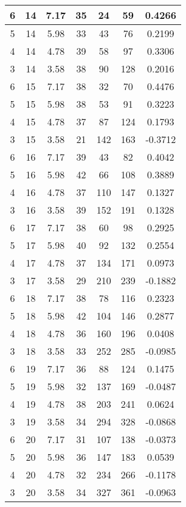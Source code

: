 \documentclass[letterpaper, 12pt]{article}
\begin{document}
\begin{longtable}{|c|c|c|c|c|c|c|}
\hline
6 & 14 & 7.17 & 35 & 24 & 59 & 0.4266 \\
\hline
5 & 14 & 5.98 & 33 & 43 & 76 & 0.2199 \\
\hline
4 & 14 & 4.78 & 39 & 58 & 97 & 0.3306 \\
\hline
3 & 14 & 3.58 & 38 & 90 & 128 & 0.2016 \\
\hline
6 & 15 & 7.17 & 38 & 32 & 70 & 0.4476 \\
\hline
5 & 15 & 5.98 & 38 & 53 & 91 & 0.3223 \\
\hline
4 & 15 & 4.78 & 37 & 87 & 124 & 0.1793 \\
\hline
3 & 15 & 3.58 & 21 & 142 & 163 & -0.3712 \\
\hline
6 & 16 & 7.17 & 39 & 43 & 82 & 0.4042 \\
\hline
5 & 16 & 5.98 & 42 & 66 & 108 & 0.3889 \\
\hline
4 & 16 & 4.78 & 37 & 110 & 147 & 0.1327 \\
\hline
3 & 16 & 3.58 & 39 & 152 & 191 & 0.1328 \\
\hline
6 & 17 & 7.17 & 38 & 60 & 98 & 0.2925 \\
\hline
5 & 17 & 5.98 & 40 & 92 & 132 & 0.2554 \\
\hline
4 & 17 & 4.78 & 37 & 134 & 171 & 0.0973 \\
\hline
3 & 17 & 3.58 & 29 & 210 & 239 & -0.1882 \\
\hline
6 & 18 & 7.17 & 38 & 78 & 116 & 0.2323 \\
\hline
5 & 18 & 5.98 & 42 & 104 & 146 & 0.2877 \\
\hline
4 & 18 & 4.78 & 36 & 160 & 196 & 0.0408 \\
\hline
3 & 18 & 3.58 & 33 & 252 & 285 & -0.0985 \\
\hline
6 & 19 & 7.17 & 36 & 88 & 124 & 0.1475 \\
\hline
5 & 19 & 5.98 & 32 & 137 & 169 & -0.0487 \\
\hline
4 & 19 & 4.78 & 38 & 203 & 241 & 0.0624 \\
\hline
3 & 19 & 3.58 & 34 & 294 & 328 & -0.0868 \\
\hline
6 & 20 & 7.17 & 31 & 107 & 138 & -0.0373 \\
\hline
5 & 20 & 5.98 & 36 & 147 & 183 & 0.0539 \\
\hline
4 & 20 & 4.78 & 32 & 234 & 266 & -0.1178 \\
\hline
3 & 20 & 3.58 & 34 & 327 & 361 & -0.0963 \\
\hline
\end{longtable}
\end{document}
